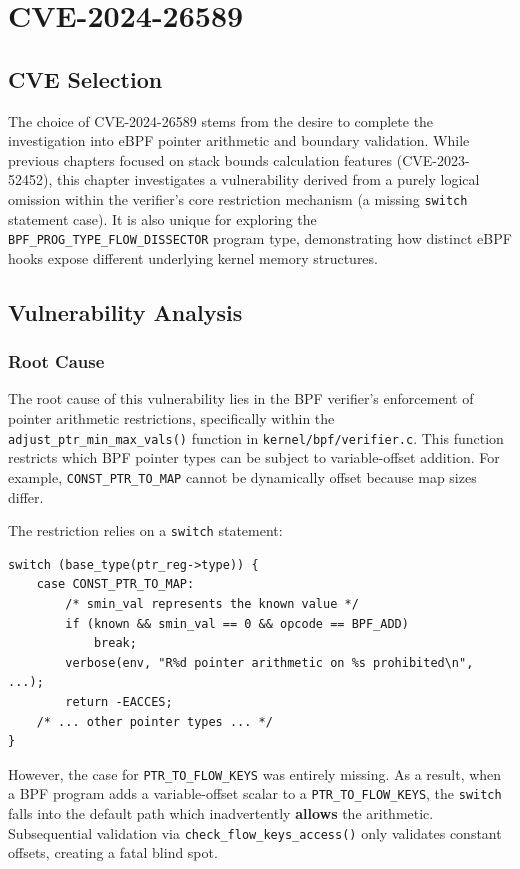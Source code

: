 \chapter{CVE-2024-26589}

\section{CVE Selection}
The choice of CVE-2024-26589 stems from the desire to complete the investigation into eBPF pointer arithmetic and boundary validation. While previous chapters focused on stack bounds calculation features (CVE-2023-52452), this chapter investigates a vulnerability derived from a purely logical omission within the verifier's core restriction mechanism (a missing \texttt{switch} statement case). It is also unique for exploring the \texttt{BPF\_PROG\_TYPE\_FLOW\_DISSECTOR} program type, demonstrating how distinct eBPF hooks expose different underlying kernel memory structures.

\section{Vulnerability Analysis}

\subsection{Root Cause}

The root cause of this vulnerability lies in the BPF verifier's enforcement of pointer arithmetic restrictions, specifically within the \texttt{adjust\_ptr\_min\_max\_vals()} function in \texttt{kernel/bpf/verifier.c}.
This function restricts which BPF pointer types can be subject to variable-offset addition. For example, \texttt{CONST\_PTR\_TO\_MAP} cannot be dynamically offset because map sizes differ.

The restriction relies on a \texttt{switch} statement:
\begin{lstlisting}[style=kernel]
switch (base_type(ptr_reg->type)) {
    case CONST_PTR_TO_MAP:
        /* smin_val represents the known value */
        if (known && smin_val == 0 && opcode == BPF_ADD)
            break;
        verbose(env, "R%d pointer arithmetic on %s prohibited\n", ...);
        return -EACCES;
    /* ... other pointer types ... */
}
\end{lstlisting}

However, the case for \texttt{PTR\_TO\_FLOW\_KEYS} was entirely missing. As a result, when a BPF program adds a variable-offset scalar to a \texttt{PTR\_TO\_FLOW\_KEYS}, the \texttt{switch} falls into the default path which inadvertently \textbf{allows} the arithmetic. Subsequential validation via \texttt{check\_flow\_keys\_access()} only validates constant offsets, creating a fatal blind spot.

